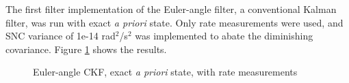 \documentclass[]{aiaa-tc}%
\begin{document}
	\vspace{5 mm}

The first filter implementation of the Euler-angle filter, a conventional Kalman filter, was run with exact \textit{a priori} state. Only rate measurements were used, and SNC variance of 1e-14 rad$^2$/s$^2$ was implemented to abate the diminishing covariance. Figure \ref{fig:ResultsEulerAPExact} shows the results.
	\begin{figure}[H]
		\centering
		\caption{Euler-angle CKF, exact \textit{a priori} state, with rate measurements }
		\label{fig:ResultsEulerAPExact}
	\end{figure}	
\end{document}
